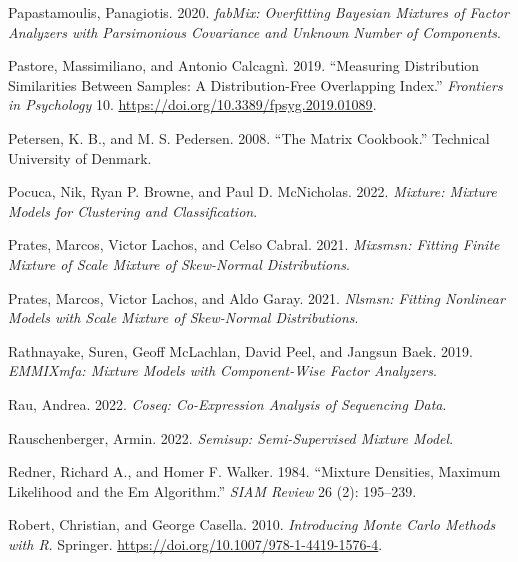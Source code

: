 \begin{CSLReferences}{1}{0}
\leavevmode{}%
Papastamoulis, Panagiotis. 2020. \emph{fabMix: Overfitting Bayesian Mixtures of Factor Analyzers with Parsimonious Covariance and Unknown Number of Components}.

\leavevmode{}%
Pastore, Massimiliano, and Antonio Calcagnì. 2019. {``Measuring {Distribution Similarities Between Samples}: {A Distribution-Free Overlapping Index}.''} \emph{Frontiers in Psychology} 10. \url{https://doi.org/10.3389/fpsyg.2019.01089}.

\leavevmode{}%
Petersen, K. B., and M. S. Pedersen. 2008. {``The Matrix Cookbook.''} Technical University of Denmark.

\leavevmode{}%
Pocuca, Nik, Ryan P. Browne, and Paul D. McNicholas. 2022. \emph{Mixture: Mixture Models for Clustering and Classification}.

\leavevmode{}%
Prates, Marcos, Victor Lachos, and Celso Cabral. 2021. \emph{Mixsmsn: Fitting Finite Mixture of Scale Mixture of Skew-Normal Distributions}.

\leavevmode{}%
Prates, Marcos, Victor Lachos, and Aldo Garay. 2021. \emph{Nlsmsn: Fitting Nonlinear Models with Scale Mixture of Skew-Normal Distributions}.

\leavevmode{}%
Rathnayake, Suren, Geoff McLachlan, David Peel, and Jangsun Baek. 2019. \emph{EMMIXmfa: Mixture Models with Component-Wise Factor Analyzers}.

\leavevmode{}%
Rau, Andrea. 2022. \emph{Coseq: Co-Expression Analysis of Sequencing Data}.

\leavevmode{}%
Rauschenberger, Armin. 2022. \emph{Semisup: Semi-Supervised Mixture Model}.

\leavevmode{}%
Redner, Richard A., and Homer F. Walker. 1984. {``Mixture {Densities}, {Maximum Likelihood} and the {Em Algorithm}.''} \emph{SIAM Review} 26 (2): 195--239.

\leavevmode{}%
Robert, Christian, and George Casella. 2010. \emph{Introducing {Monte Carlo Methods} with {R}}. {Springer}. \url{https://doi.org/10.1007/978-1-4419-1576-4}.


\end{CSLReferences}
